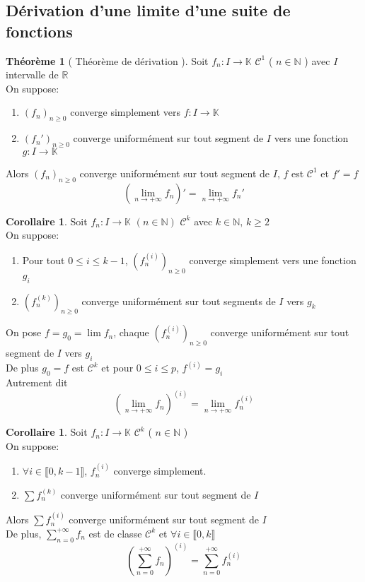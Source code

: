 \documentclass[10pt,a4paper]{article}
\theoremstyle{definition}
\newtheorem{theorem}[proposition]{Théorème}
\newtheorem{corollaire}[proposition]{Corollaire}
\begin{document}
\subsection{Dérivation d'une limite d'une suite de fonctions}
\begin{theorem}[ Théorème de dérivation ]
    Soit $f_n: I \to \mathbb{K}$ $\mathcal{C}^1$ ( $n \in \mathbb{N}$ ) avec $I$ intervalle de $\mathbb{R}$ \\
    On suppose:
    \begin{enumerate}
        \item $(f_n)_{n \geq 0}$ converge simplement vers $f: I \to \mathbb{K}$
        \item $(f_n')_{n \geq 0}$ converge uniformément sur tout segment de $I$ vers une fonction $g: I \to \mathbb{K}$
    \end{enumerate}
    Alors $(f_n)_{n \geq 0}$ converge uniformément sur tout segment de $I$, $f$ est $\mathcal{C}^1$ et $f' = f$
    \[\left(\lim_{n \to +\infty} f_n\right)' = \lim_{n \to +\infty} f_n'\]
\end{theorem}
\begin{corollaire}
    Soit \(f_n: I \to \mathbb{K}\) \((n \in \mathbb{N})\) \(\mathcal{C}^k\) avec \(k \in \mathbb{N},\, k \geq 2\) \\
    On suppose:
    \begin{enumerate}
        \item Pour tout \(0 \leq i \leq k - 1\), \(\left(f_n^{(i)}\right)_{n \geq 0}\) converge simplement vers une fonction \(g_i\)
        \item \(\left(f_n^{(k)}\right)_{n \geq 0}\) converge uniformément sur tout segments de \(I\) vers \(g_k\)
    \end{enumerate}
    On pose \(f = g_0 = \lim f_n\), chaque \(\left(f_n^{(i)}\right)_{n \geq 0}\) converge uniformément sur tout segment de \(I\) vers \(g_i\) \\
    De plus \(g_0 = f\) est \(\mathcal{C}^k\) et pour \(0 \leq i \leq p\), \(f^{(i)} = g_i\) \\
    Autrement dit
    \[\boxed{\left(\lim_{n \to +\infty} f_n\right)^{(i)} = \lim_{n \to +\infty} f_n^{(i)}}\]
\end{corollaire}
\begin{corollaire}
    Soit $f_n: I \to \mathbb{K}$ $\mathcal{C}^k$ ( $n \in \mathbb{N}$ ) \\
    On suppose:
    \begin{enumerate}
        \item $\forall i \in \llbracket 0, k-1 \rrbracket$, $f_n^{(i)}$ converge simplement.
        \item $\sum f_n^{(k)}$ converge uniformément sur tout segment de $I$
    \end{enumerate}
    Alors $\sum f_n^{(i)}$ converge uniformément sur tout segment de $I$ \\
    De plus, $\sum\limits_{n = 0}^{+\infty} f_n$ est de classe $\mathcal{C}^k$ et $\forall i \in \llbracket 0, k \rrbracket$
    \[\boxed{\left(\sum_{n = 0}^{+\infty}f_n\right)^{(i)} = \sum_{n = 0}^{+\infty}f_n^{(i)}}\]
\end{corollaire}
\end{document}
